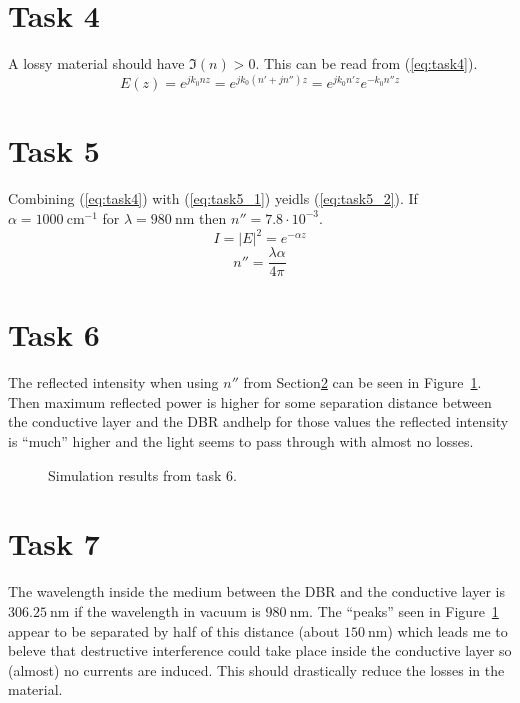 \documentclass[12pt,a4paper]{article}
\begin{document}
\section{Task 4}\label{sec:4}
A lossy material should have $\Im(n)>0$. This can be read from (\ref{eq:task4}).
\begin{equation}
  \label{eq:task4}
  E(z)=e^{jk_0nz}=e^{jk_0(n'+jn'')z}=e^{jk_0n'z}e^{-k_0n''z}
\end{equation}
\section{Task 5}\label{sec:5}
Combining (\ref{eq:task4}) with (\ref{eq:task5_1}) yeidls (\ref{eq:task5_2}). If $\alpha=\SI{1000}{\centi\metre^{-1}}$ for $\lambda=\SI{980}{\nano\metre}$ then $n''=7.8\cdot 10^{-3}$.
\begin{equation}
  \label{eq:task5_1}
  I=|E|^2=e^{-\alpha z}
\end{equation}
\begin{equation}
  \label{eq:task5_2}
  n''=\frac{\lambda\alpha}{4\pi}
\end{equation}
\section{Task 6}\label{sec:6}
The reflected intensity when using $n''$ from Section\ref{sec:5} can be seen in Figure~\ref{fig:task6}. Then maximum reflected power is higher for some separation distance between the conductive layer and the DBR andhelp for those values the reflected intensity is ``much'' higher and the light seems to pass through with almost no losses.
\begin{figure}
  \centering
  \noindent\makebox[\textwidth]{\scalebox{0.7}{}}
  \caption{Simulation results from task 6.}
  \label{fig:task6}
\end{figure}

\section{Task 7}\label{sec:7}
The wavelength inside the medium between the DBR and the conductive layer is $\SI{306.25}{\nano\meter}$ if the wavelength in vacuum is $\SI{980}{\nano\metre}$. The ``peaks'' seen in Figure~\ref{fig:task6} appear to be separated by half of this distance (about $\SI{150}{\nano\metre}$) which leads me to beleve that destructive interference could take place inside the conductive layer so (almost) no currents are induced. This should drastically reduce the losses in the material.
\end{document}
